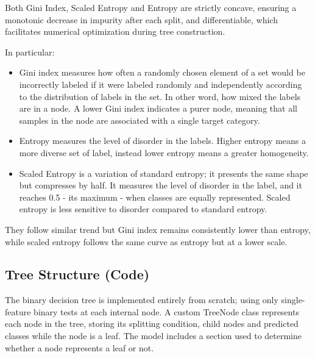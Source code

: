 \documentclass{article}
\begin{document}
Both Gini Index, Scaled Entropy and Entropy are strictly concave, ensuring a monotonic decrease in impurity after each split, and differentiable, which facilitates numerical optimization during tree construction. 


In particular:
\begin{itemize}
    \item Gini index measures how often a randomly chosen element of a set would be incorrectly labeled if it were labeled randomly and independently according to the distribution of labels in the set. In other word, how mixed the labels are in a node. A lower Gini index indicates a purer node, meaning that all samples in the node are associated with a single target category.

    \item Entropy measures the level of disorder in the labels. Higher entropy means a more diverse set of label, instead lower entropy means a greater homogeneity.

    \item Scaled Entropy is a variation of standard entropy; it presents the same shape but compresses by half. It measures the level of disorder in the label, and it reaches 0.5 - its maximum - when classes are equally represented. Scaled entropy is less sensitive to disorder compared to standard entropy.
\end{itemize}

They follow similar trend but Gini index remains consistently lower than entropy, while scaled entropy follows the same curve as entropy but at a lower scale.

\subsection{Tree Structure (Code)}

The binary decision tree is implemented entirely from scratch; using only single-feature binary tests at each internal node.
A custom TreeNode class represents each node in the tree, storing its splitting condition, child nodes and predicted classes while the node is a leaf. The model includes a section used to determine whether a node represents a leaf or not.
\end{document}
